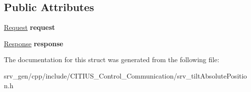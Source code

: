 \subsection*{\-Public \-Attributes}
\begin{DoxyCompactItemize}
\item 
\hypertarget{struct_c_i_t_i_u_s___control___communication_1_1srv__tilt_absolute_position_a8f397075c37e11fabff22e1866f1760d}{\hyperlink{struct_c_i_t_i_u_s___control___communication_1_1srv__tilt_absolute_position_request__}{\-Request} {\bfseries request}}\label{struct_c_i_t_i_u_s___control___communication_1_1srv__tilt_absolute_position_a8f397075c37e11fabff22e1866f1760d}

\item 
\hypertarget{struct_c_i_t_i_u_s___control___communication_1_1srv__tilt_absolute_position_a280b292588309821abe74b3106aa416d}{\hyperlink{struct_c_i_t_i_u_s___control___communication_1_1srv__tilt_absolute_position_response__}{\-Response} {\bfseries response}}\label{struct_c_i_t_i_u_s___control___communication_1_1srv__tilt_absolute_position_a280b292588309821abe74b3106aa416d}

\end{DoxyCompactItemize}


\-The documentation for this struct was generated from the following file\-:\begin{DoxyCompactItemize}
\item 
srv\-\_\-gen/cpp/include/\-C\-I\-T\-I\-U\-S\-\_\-\-Control\-\_\-\-Communication/srv\-\_\-tilt\-Absolute\-Position.\-h\end{DoxyCompactItemize}
